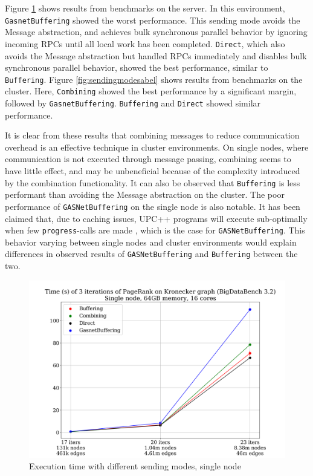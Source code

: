 \documentclass{uit-report}
\begin{document}
Figure \ref{fig:sendingmodes} shows results from benchmarks on the server. In this environment, \\\texttt{GasnetBuffering} showed the worst performance. This sending mode avoids the Message abstraction, and achieves bulk synchronous parallel behavior by ignoring incoming RPCs until all local work has been completed. \texttt{Direct}, which also avoids the Message abstraction but handled RPCs immediately and disables bulk synchronous parallel behavior, showed the best performance, similar to \texttt{Buffering}. Figure \ref{fig:sendingmodesabel} shows results from benchmarks on the cluster. Here, \texttt{Combining} showed the best performance by a significant margin, followed by \texttt{GasnetBuffering}. \texttt{Buffering} and \texttt{Direct} showed similar performance.

It is clear from these results that combining messages to reduce communication overhead is an effective technique in cluster environments. On single nodes, where communication is not executed through message passing, combining seems to have little effect, and may be unbeneficial because of the complexity introduced by the combination functionality.
It can also be observed that \texttt{Buffering} is less performant than avoiding the Message abstraction on the cluster. The poor performance of \texttt{GASNetBuffering} on the single node is also notable. It has been claimed that, due to caching issues, UPC++ programs will execute sub-optimally when few \texttt{progress}-calls are made \cite{gasneteventissues}, which is the case for \texttt{GASNetBuffering}. This behavior varying between single nodes and cluster environments would explain differences in observed results of \texttt{GASNetBuffering} and \texttt{Buffering} between the two.



\newpage
\begin{figure}[H]
	\centering
	\includegraphics[width=15cm]{illustrations/png/sendingmodessinglenode.png}
	\caption{Execution time with different sending modes, single node}
	\label{fig:sendingmodes}
\end{figure}
\end{document}
